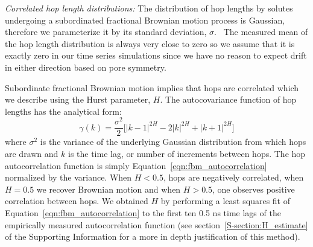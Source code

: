 \documentclass[journal=jctcce,manuscript=article]{achemso}
\begin{document}
  \textit{Correlated hop length distributions:} The distribution of hop 
  lengths by solutes undergoing a subordinated fractional Brownian motion 
  process is Gaussian, therefore we parameterize it by its standard deviation,
  $\sigma$.~\cite{metzler_random_2000, metzler_anomalous_2014,neusius_subdiffusion_2009}
  The measured mean of the hop length distribution is always very close to zero so
  we assume that it is exactly zero in our time series simulations since we have 
  no reason to expect drift in either direction based on pore symmetry.

  Subordinate fractional Brownian motion implies that hops are correlated which 
  we describe using the Hurst parameter, $H$. The autocovariance function of hop
  lengths has the analytical form:~\cite{mandelbrot_fractional_1968}
  \begin{equation}
    \gamma(k) = \dfrac{\sigma^2}{2}\bigg[|k-1|^{2H} - 2|k|^{2H} + |k+1|^{2H}\bigg]
  \label{eqn:fbm_autocorrelation}
  \end{equation}
  where $\sigma^2$ is the variance of the underlying Gaussian distribution from
  which hops are drawn and $k$ is the time lag, or number of increments between
  hops. The hop autocorrelation function is simply
  Equation~\ref{eqn:fbm_autocorrelation} normalized by the variance.  When $H <
  0.5$, hops are negatively correlated, when $H = 0.5$ we recover Brownian
  motion and when $H > 0.5$, one observes positive correlation between hops. 
  We obtained $H$ by performing a least squares fit of 
  Equation~\ref{eqn:fbm_autocorrelation} to the first ten 0.5 ns time lags of 
  the empirically measured autocorrelation function (see section~\ref{S-section:H_estimate}
  of the Supporting Information for a more in depth justification of this method).
 
\end{document}
